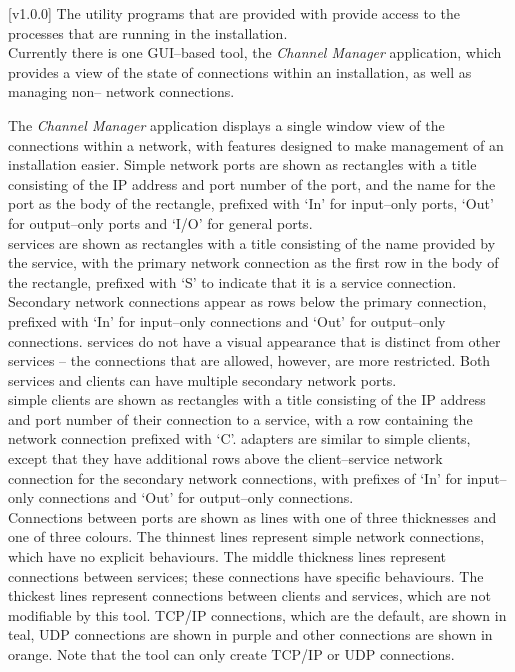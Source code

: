 [v1.0.0]
The utility programs that are provided with \mplusm{} provide access to the processes that
are running in the \mplusm{} installation.\\

Currently there is one GUI--based tool, the \emph{Channel Manager} application,
which provides a view of the state of connections within an \mplusm{} installation, as
well as managing non--\mplusm{} \yarp{} network connections.

The \emph{Channel Manager} application displays a single window view of the connections
within a \yarp{} network, with features designed to make management of an \mplusm{}
installation easier.
Simple \yarp{} network ports are shown as rectangles with a title consisting of the IP
address and port number of the port, and the \yarp{} name for the port as the body of the
rectangle, prefixed with `In' for input--only ports, `Out' for output--only ports and
`I/O' for general ports.\\

\mplusm{} services are shown as rectangles with a title consisting of the name provided by
the service, with the primary \yarp{} network connection as the first row in the body of
the rectangle, prefixed with `S' to indicate that it is a service connection.
Secondary \yarp{} network connections appear as rows below the primary connection,
prefixed with `In' for input--only connections and `Out' for output--only connections.
\mplusm{}  services do not have a visual appearance that is distinct from
other \mplusm{} services -- the connections that are allowed, however, are more
restricted.
Both \mplusm{} services and clients can have multiple secondary \yarp{} network ports.\\

\mplusm{} simple clients are shown as rectangles with a title consisting of the IP address
and port number of their connection to a service, with a row containing the \yarp{}
network connection prefixed with `C'.
\mplusm{} adapters are similar to \mplusm{} simple clients, except that they have
additional rows above the client--service \yarp{} network connection for the secondary
\yarp{} network connections, with prefixes of `In' for input--only connections and `Out'
for output--only connections.\\

Connections between ports are shown as lines with one of three thicknesses and one of
three colours.
The thinnest lines represent simple \yarp{} network connections, which have no explicit
behaviours.
The middle thickness lines represent connections between  services; these
connections have specific behaviours.
The thickest lines represent connections between clients and services, which are not
modifiable by this tool.
TCP/IP connections, which are the default, are shown in teal, UDP connections are shown in
purple and other connections are shown in orange.
Note that the tool can only create TCP/IP or UDP connections.\\

